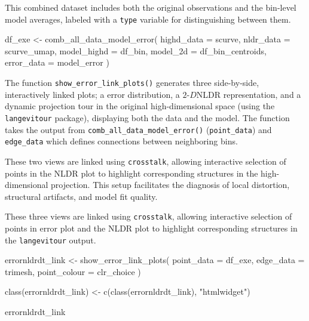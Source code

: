 \documentclass[
  11pt,
  a4paper,
]{report}
\newenvironment{Shaded}{\begin{snugshade}}{\end{snugshade}}
\newcommand{\AttributeTok}[1]{\textcolor[rgb]{0.40,0.45,0.13}{#1}}
\newcommand{\FunctionTok}[1]{\textcolor[rgb]{0.28,0.35,0.67}{#1}}
\newcommand{\NormalTok}[1]{\textcolor[rgb]{0.00,0.23,0.31}{#1}}
\newcommand{\OtherTok}[1]{\textcolor[rgb]{0.00,0.23,0.31}{#1}}
\newcommand{\StringTok}[1]{\textcolor[rgb]{0.13,0.47,0.30}{#1}}
\newcommand{\twoD}{$2\text{-}D$}
\begin{document}
This combined dataset includes both the original observations and the
bin-level model averages, labeled with a \texttt{type} variable for
distinguishing between them.

\begin{Shaded}
\begin{Highlighting}[]
\NormalTok{df\_exe }\OtherTok{\textless{}{-}} \FunctionTok{comb\_all\_data\_model\_error}\NormalTok{(}
  \AttributeTok{highd\_data =}\NormalTok{ scurve, }
  \AttributeTok{nldr\_data =}\NormalTok{ scurve\_umap, }
  \AttributeTok{model\_highd =}\NormalTok{ df\_bin, }
  \AttributeTok{model\_2d =}\NormalTok{ df\_bin\_centroids, }
  \AttributeTok{error\_data =}\NormalTok{ model\_error}
\NormalTok{  )}
\end{Highlighting}
\end{Shaded}

The function \texttt{show\_error\_link\_plots()} generates three
side-by-side, interactively linked plots; a error distribution, a
\twoD NLDR representation, and a dynamic projection tour in the original
high-dimensional space (using the \texttt{langevitour} package),
displaying both the data and the model. The function takes the output
from \texttt{comb\_all\_data\_model\_error()} (\texttt{point\_data}) and
\texttt{edge\_data} which defines connections between neighboring bins.

These two views are linked using \texttt{crosstalk}, allowing
interactive selection of points in the NLDR plot to highlight
corresponding structures in the high-dimensional projection. This setup
facilitates the diagnosis of local distortion, structural artifacts, and
model fit quality.

These three views are linked using \texttt{crosstalk}, allowing
interactive selection of points in error plot and the NLDR plot to
highlight corresponding structures in the \texttt{langevitour} output.

\begin{Shaded}
\begin{Highlighting}[]
\NormalTok{errornldrdt\_link }\OtherTok{\textless{}{-}} \FunctionTok{show\_error\_link\_plots}\NormalTok{(}
  \AttributeTok{point\_data =}\NormalTok{ df\_exe, }
  \AttributeTok{edge\_data =}\NormalTok{ trimesh, }
  \AttributeTok{point\_colour =}\NormalTok{ clr\_choice}
\NormalTok{)}

\FunctionTok{class}\NormalTok{(errornldrdt\_link) }\OtherTok{\textless{}{-}} \FunctionTok{c}\NormalTok{(}\FunctionTok{class}\NormalTok{(errornldrdt\_link), }\StringTok{"htmlwidget"}\NormalTok{)}

\NormalTok{errornldrdt\_link}
\end{Highlighting}
\end{Shaded}
\end{document}
